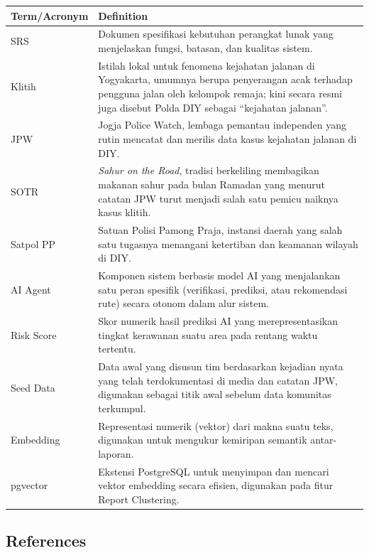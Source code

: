 \documentclass[11pt,a4paper]{article}
\begin{document}
\begin{tabularx}{\textwidth}{|L{3.4cm}|Y|}
\hline
{}\textbf{Term/Acronym} & \textbf{Definition} \\ \hline
SRS & Dokumen spesifikasi kebutuhan perangkat lunak yang menjelaskan fungsi, batasan, dan kualitas sistem. \\ \hline
Klitih & Istilah lokal untuk fenomena kejahatan jalanan di Yogyakarta, umumnya berupa penyerangan acak terhadap pengguna jalan oleh kelompok remaja; kini secara resmi juga disebut Polda DIY sebagai ``kejahatan jalanan''. \\ \hline
JPW & Jogja Police Watch, lembaga pemantau independen yang rutin mencatat dan merilis data kasus kejahatan jalanan di DIY. \\ \hline
SOTR & \textit{Sahur on the Road}, tradisi berkeliling membagikan makanan sahur pada bulan Ramadan yang menurut catatan JPW turut menjadi salah satu pemicu naiknya kasus klitih. \\ \hline
Satpol PP & Satuan Polisi Pamong Praja, instansi daerah yang salah satu tugasnya menangani ketertiban dan keamanan wilayah di DIY. \\ \hline
AI Agent & Komponen sistem berbasis model AI yang menjalankan satu peran spesifik (verifikasi, prediksi, atau rekomendasi rute) secara otonom dalam alur sistem. \\ \hline
Risk Score & Skor numerik hasil prediksi AI yang merepresentasikan tingkat kerawanan suatu area pada rentang waktu tertentu. \\ \hline
Seed Data & Data awal yang disusun tim berdasarkan kejadian nyata yang telah terdokumentasi di media dan catatan JPW, digunakan sebagai titik awal sebelum data komunitas terkumpul. \\ \hline
Embedding & Representasi numerik (vektor) dari makna suatu teks, digunakan untuk mengukur kemiripan semantik antar-laporan. \\ \hline
pgvector & Ekstensi PostgreSQL untuk menyimpan dan mencari vektor embedding secara efisien, digunakan pada fitur Report Clustering. \\ \hline
\end{tabularx}

\subsection{References}
\end{document}
